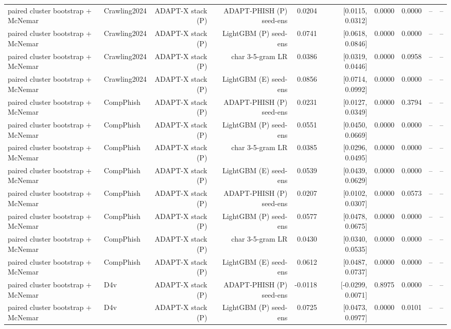 \begin{table}[t]
\begin{tabular}{llrrrrrrrr}
paired cluster bootstrap + McNemar & Crawling2024 & ADAPT-X stack (P) & ADAPT-PHISH (P) seed-ens & 0.0204 & [0.0115, 0.0312] & 0.0000 & 0.0000 & -- & -- \\
paired cluster bootstrap + McNemar & Crawling2024 & ADAPT-X stack (P) & LightGBM (P) seed-ens & 0.0741 & [0.0618, 0.0846] & 0.0000 & 0.0000 & -- & -- \\
paired cluster bootstrap + McNemar & Crawling2024 & ADAPT-X stack (P) & char 3-5-gram LR & 0.0386 & [0.0319, 0.0446] & 0.0000 & 0.0958 & -- & -- \\
paired cluster bootstrap + McNemar & Crawling2024 & ADAPT-X stack (P) & LightGBM (E) seed-ens & 0.0856 & [0.0714, 0.0992] & 0.0000 & 0.0000 & -- & -- \\
paired cluster bootstrap + McNemar & CompPhish & ADAPT-X stack (P) & ADAPT-PHISH (P) seed-ens & 0.0231 & [0.0127, 0.0349] & 0.0000 & 0.3794 & -- & -- \\
paired cluster bootstrap + McNemar & CompPhish & ADAPT-X stack (P) & LightGBM (P) seed-ens & 0.0551 & [0.0450, 0.0669] & 0.0000 & 0.0000 & -- & -- \\
paired cluster bootstrap + McNemar & CompPhish & ADAPT-X stack (P) & char 3-5-gram LR & 0.0385 & [0.0296, 0.0495] & 0.0000 & 0.0000 & -- & -- \\
paired cluster bootstrap + McNemar & CompPhish & ADAPT-X stack (P) & LightGBM (E) seed-ens & 0.0539 & [0.0439, 0.0629] & 0.0000 & 0.0000 & -- & -- \\
paired cluster bootstrap + McNemar & CompPhish & ADAPT-X stack (P) & ADAPT-PHISH (P) seed-ens & 0.0207 & [0.0102, 0.0307] & 0.0000 & 0.0573 & -- & -- \\
paired cluster bootstrap + McNemar & CompPhish & ADAPT-X stack (P) & LightGBM (P) seed-ens & 0.0577 & [0.0478, 0.0675] & 0.0000 & 0.0000 & -- & -- \\
paired cluster bootstrap + McNemar & CompPhish & ADAPT-X stack (P) & char 3-5-gram LR & 0.0430 & [0.0340, 0.0535] & 0.0000 & 0.0000 & -- & -- \\
paired cluster bootstrap + McNemar & CompPhish & ADAPT-X stack (P) & LightGBM (E) seed-ens & 0.0612 & [0.0487, 0.0737] & 0.0000 & 0.0000 & -- & -- \\
paired cluster bootstrap + McNemar & D4v & ADAPT-X stack (P) & ADAPT-PHISH (P) seed-ens & -0.0118 & [-0.0299, 0.0071] & 0.8975 & 0.0000 & -- & -- \\
paired cluster bootstrap + McNemar & D4v & ADAPT-X stack (P) & LightGBM (P) seed-ens & 0.0725 & [0.0473, 0.0977] & 0.0000 & 0.0101 & -- & -- \\

\end{tabular}
\end{table}
